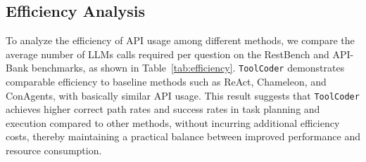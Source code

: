 \begin{table}[t]
\centering
{}
\caption{Efficiency analysis of different methods on the RestBench and API-Bank datasets. We report the average number of API calls required per question, where a lower value indicates higher efficiency.}
\label{tab:efficiency}
\end{table}

\subsection{Efficiency Analysis}
To analyze the efficiency of API usage among different methods, we compare the average number of LLMs calls required per question on the RestBench and API-Bank benchmarks, as shown in Table~\ref{tab:efficiency}. \texttt{ToolCoder} demonstrates comparable efficiency to baseline methods such as ReAct, Chameleon, and ConAgents, with basically similar API usage. This result suggests that \texttt{ToolCoder} achieves higher correct path rates and success rates in task planning and execution compared to other methods, without incurring additional efficiency costs, thereby maintaining a practical balance between improved performance and resource consumption.


